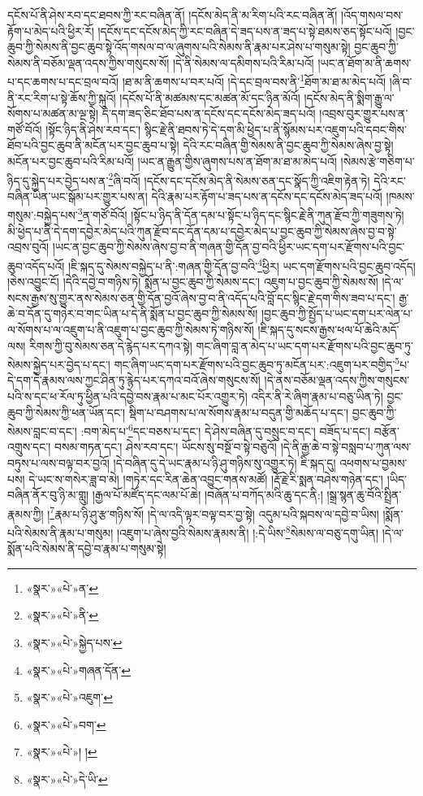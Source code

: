 དངོས་པོ་ནི་ཤེས་རབ་དང་ཐབས་ཀྱི་རང་བཞིན་ནོ། །དངོས་མེད་ནི་མ་རིག་པའི་རང་བཞིན་ནོ། །འོད་གསལ་བས་རྟོག་པ་མེད་པའི་ཕྱིར་རོ། །དངོས་དང་དངོས་མེད་ཀྱི་རང་བཞིན་དེ་ཟད་པས་ན་ཟད་པ་སྟེ་ཐམས་ཅད་སྟོང་པའོ། །བྱང་ཆུབ་ཀྱི་སེམས་ནི་བྱང་ཆུབ་སྟེ་འོད་གསལ་བ་ལ་ཞུགས་པའི་སེམས་ནི་རྣམ་པར་ཤེས་པ་གསུམ་སྟེ། བྱང་ཆུབ་ཀྱི་སེམས་ནི་བཅོམ་ལྡན་འདས་ཀྱིས་གསུངས་སོ། །དེ་ནི་སེམས་ལ་དམིགས་པའི་རིམ་པའོ། །ཡང་ན་ཐོག་མ་ནི་ཆགས་པ་དང་ཆགས་པ་དང་བྲལ་བའོ། །ཐ་མ་ནི་ཆགས་པ་བར་པའོ། །དེ་དང་བྲལ་བས་ནི་\footnote{«སྣར་»«པེ་»ན་}ཐོག་མ་ཐ་མ་མེད་པའོ། །ཞི་བ་ནི་རང་རིག་པ་སྟེ་ཆོས་ཀྱི་སྐུའོ། །དངོས་པོ་ནི་མཚམས་དང་མཚན་མོ་དང་ཉིན་མོའོ། །དངོས་མེད་ནི་སྨིག་རྒྱུ་ལ་སོགས་པ་མཚན་མ་ལྔ་སྟེ། དེ་དག་ཟད་ཅིང་ཐོབ་པས་ན་དངོས་དང་དངོས་མེད་ཟད་པའོ། །འབྲས་བུར་གྱུར་པས་ན་གཙོ་བོའོ། །སྟོང་ཉིད་ནི་ཤེས་རབ་དང་། སྙིང་རྗེ་ནི་ཐབས་ཏེ་དེ་དག་མི་ཕྱེད་པ་ནི་སྙོམས་པར་འཇུག་པའི་དབང་གིས་ཐོབ་པའི་བྱང་ཆུབ་ནི་མངོན་པར་བྱང་ཆུབ་པ་སྟེ། དེའི་རང་བཞིན་གྱི་སེམས་ནི་བྱང་ཆུབ་ཀྱི་སེམས་ཞེས་བྱ་སྟེ། མངོན་པར་བྱང་ཆུབ་པའི་རིམ་པའོ། །ཡང་ན་རྒྱུན་གྱིས་ཞུགས་པས་ན་ཐོག་མ་ཐ་མ་མེད་པའོ། །སེམས་རྩེ་གཅིག་པ་ཉིད་དུ་སྐྱེད་པར་བྱེད་པས་ན་\footnote{«སྣར་»«པེ་»ནི་}ཞི་བའོ། །དངོས་དང་དངོས་མེད་ནི་སེམས་ཅན་དང་སྣོད་ཀྱི་འཇིག་རྟེན་ཏེ། དེའི་རང་བཞིན་ཡིན་ཡང་སྒོམ་པར་གྱུར་པས་ན། དེའི་རྣམ་པར་རྟོག་པ་ཟད་པས་ན་དངོས་དང་དངོས་མེད་ཟད་པའོ། །ཁམས་གསུམ་:བསྐྱེད་པས་\footnote{«སྣར་»«པེ་»སྐྱེད་པས་}ན་གཙོ་བོའོ། །སྟོང་པ་ཉིད་ནི་དོན་དམ་པ་སྟོང་པ་ཉིད་དང་སྙིང་རྗེ་ནི་ཀུན་རྫོབ་ཀྱི་གཟུགས་ཏེ། མི་ཕྱེད་པ་ནི་དེ་དག་དབྱེར་མེད་པའི་ཀུན་རྫོབ་དང་དོན་དམ་པ་དབྱེར་མེད་པ་བྱང་ཆུབ་ཀྱི་སེམས་ཞེས་བྱ་བ་སྟེ་འབྲས་བུའོ། །ཡང་ན་བྱང་ཆུབ་ཀྱི་སེམས་ཞེས་བྱ་བ་ནི་གཞན་གྱི་དོན་བྱ་བའི་ཕྱིར་ཡང་དག་པར་རྫོགས་པའི་བྱང་ཆུབ་འདོད་པའོ། །ཇི་སྐད་དུ་སེམས་བསྐྱེད་པ་ནི་:གཞན་གྱི་དོན་བྱ་བའི་\footnote{«སྣར་»«པེ་»གཞན་དོན་}ཕྱིར། ཡང་དག་རྫོགས་པའི་བྱང་ཆུབ་འདོད། །ཅེས་འབྱུང་ངོ། །དེའི་དབྱེ་བ་གཉིས་ཏེ། སྨོན་པ་བྱང་ཆུབ་ཀྱི་སེམས་དང་། འཇུག་པ་བྱང་ཆུབ་ཀྱི་སེམས་སོ། །དེ་ལ་སངས་རྒྱས་སུ་གྱུར་ནས་སེམས་ཅན་གྱི་དོན་བྱའོ་ཞེས་བྱ་བ་ནི་འདོད་པའི་བློ་དང་སྙིང་རྗེ་དག་གིས་ཟབ་པ་དང་། རྒྱ་ཆེ་བ་དོན་དུ་གཉེར་བ་གང་ཡིན་པ་དེ་ནི་སྨོན་པ་བྱང་ཆུབ་ཀྱི་སེམས་སོ། །བྱང་ཆུབ་ཀྱི་སྤྱོད་པ་ཡང་དག་པར་ལེན་པ་ལ་སོགས་པ་ལ་འཇུག་པ་ནི་འཇུག་པ་བྱང་ཆུབ་ཀྱི་སེམས་ཏེ་གཉིས་སོ། །ཇི་སྐད་དུ་སངས་རྒྱས་ཕལ་པོ་ཆེའི་མདོ་ལས། རིགས་ཀྱི་བུ་སེམས་ཅན་དེ་རྙེད་པར་དཀའ་སྟེ། གང་ཞིག་བླ་ན་མེད་པ་ཡང་དག་པར་རྫོགས་པའི་བྱང་ཆུབ་ཏུ་སེམས་སྐྱེད་པར་བྱེད་པ་དང་། གང་ཞིག་ཡང་དག་པར་རྫོགས་པའི་བྱང་ཆུབ་ཏུ་མངོན་པར་:འཇུག་པར་བགྱིད་\footnote{«སྣར་»«པེ་»འཇུག་}པ་དེ་དག་དེ་རྣམས་ལས་ཀྱང་ཤིན་ཏུ་རྙེད་པར་དཀའ་བའོ་ཞེས་གསུངས་སོ། །དེ་ནས་བཅོམ་ལྡན་འདས་ཀྱིས་གསུངས་པའི་ས་དང་ཕ་རོལ་ཏུ་ཕྱིན་པའི་དབྱེ་བས་རྣམ་པ་མང་པོར་འགྱུར་ཏེ། འདིར་ནི་རེ་ཞིག་རྣམ་པ་བཅུ་ཡིན་ཏེ། བྱང་ཆུབ་ཀྱི་སེམས་ཀྱི་ཕན་ཡོན་དང་། སྡིག་པ་བཤགས་པ་ལ་སོགས་རྣམ་པ་བདུན་གྱི་མཆོད་པ་དང་། བྱང་ཆུབ་ཀྱི་སེམས་བླང་བ་དང་། :བག་མེད་པ་\footnote{«སྣར་»«པེ་»བག་}དང་བཅས་པ་དང་། དེ་ཤེས་བཞིན་དུ་བསྲུང་བ་དང་། བཟོད་པ་དང་། བརྩོན་འགྲུས་དང་། བསམ་གཏན་དང་། ཤེས་རབ་དང་། ཡོངས་སུ་བསྔོ་བ་སྟེ་བཅུའོ། །དེ་ནི་རྒྱ་ཆེ་བ་སྟེ་བསླབ་པ་ཀུན་ལས་བཏུས་པ་ལས་བལྟ་བར་བྱའོ། །དེ་བཞིན་དུ་དེ་ཡང་རྣམ་པ་ཉི་ཤུ་གཉིས་སུ་འགྱུར་ཏེ། ཇི་སྐད་དུ། འཕགས་པ་བྱམས་པས། དེ་ཡང་ས་གསེར་ཟླ་བ་མེ། །གཏེར་དང་རིན་ཆེན་འབྱུང་གནས་མཚོ། །རྡོ་རྗེ་རི་སྨན་བཤེས་གཉེན་དང་། །ཡིད་བཞིན་ནོར་བུ་ཉི་མ་གླུ། །རྒྱལ་པོ་མཛོད་དང་ལམ་པོ་ཆེ། །བཞོན་པ་བཀོད་མའི་ཆུ་དང་ནི:། །སྒྲ་སྙན་ཆུ་བོའི་སྤྲིན་རྣམས་ཀྱི། །\footnote{«སྣར་»«པེ་»། །}རྣམ་པ་ཉི་ཤུ་རྩ་གཉིས་སོ། །དེ་ལ་འདི་ལྟར་བལྟ་བར་བྱ་སྟེ། འདུམ་པའི་སྐབས་ལ་དབྱེ་བ་ཡིས། །སྨོན་པའི་སེམས་ནི་རྣམ་པ་གསུམ། །འཇུག་པ་ཞེས་བྱའི་སེམས་རྣམས་ནི། །:དེ་ཡིས་\footnote{«སྣར་»«པེ་»དེ་ཡི་}སེམས་ལ་བཅུ་དགུ་ཡིན། །དེ་ལ་སྨོན་པའི་སེམས་ནི་དབྱེ་བ་རྣམ་པ་གསུམ་སྟེ། 